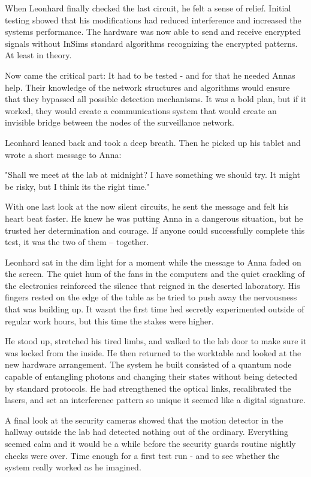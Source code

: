 \documentclass[
]{article}
\begin{document}
When Leonhard finally checked the last circuit, he felt a sense of
relief. Initial testing showed that his modifications had reduced
interference and increased the system\textquotesingle s performance. The
hardware was now able to send and receive encrypted signals without
InSim\textquotesingle s standard algorithms recognizing the encrypted
patterns. At least in theory.

Now came the critical part: It had to be tested - and for that he needed
Anna\textquotesingle s help. Their knowledge of the network structures
and algorithms would ensure that they bypassed all possible detection
mechanisms. It was a bold plan, but if it worked, they would create a
communications system that would create an invisible bridge between the
nodes of the surveillance network.

Leonhard leaned back and took a deep breath. Then he picked up his
tablet and wrote a short message to Anna:

"Shall we meet at the lab at midnight? I have something we should try.
It might be risky, but I think it\textquotesingle s the right time."

With one last look at the now silent circuits, he sent the message and
felt his heart beat faster. He knew he was putting Anna in a dangerous
situation, but he trusted her determination and courage. If anyone could
successfully complete this test, it was the two of them -- together.

Leonhard sat in the dim light for a moment while the message to Anna
faded on the screen. The quiet hum of the fans in the computers and the
quiet crackling of the electronics reinforced the silence that reigned
in the deserted laboratory. His fingers rested on the edge of the table
as he tried to push away the nervousness that was building up. It
wasn\textquotesingle t the first time he\textquotesingle d secretly
experimented outside of regular work hours, but this time the stakes
were higher.

He stood up, stretched his tired limbs, and walked to the lab door to
make sure it was locked from the inside. He then returned to the
worktable and looked at the new hardware arrangement. The system he
built consisted of a quantum node capable of entangling photons and
changing their states without being detected by standard protocols. He
had strengthened the optical links, recalibrated the lasers, and set an
interference pattern so unique it seemed like a digital signature.

A final look at the security cameras showed that the motion detector in
the hallway outside the lab had detected nothing out of the ordinary.
Everything seemed calm and it would be a while before the security
guards\textquotesingle{} routine nightly checks were over. Time enough
for a first test run - and to see whether the system really worked as he
imagined.
\end{document}
